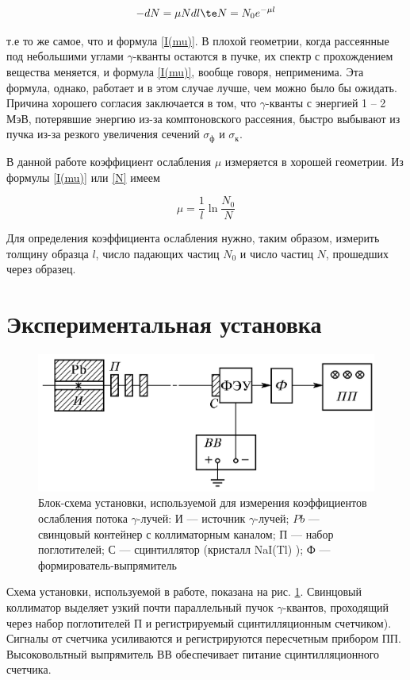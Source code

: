 \documentclass[12pt]{kiarticle} %
\newcommand{\ga}{\ensuremath{\gamma}}
\begin{document}
	\begin{equation}\label{N}
	-dN = \mu N dl \te N = N_0 e^{-\mu l}
	\end{equation}
	
	т.е то же самое, что и формула \eqref{I(mu)}. В плохой геометрии, когда рассеянные под небольшими углами
	\ga-кванты остаются в пучке, их спектр с прохождением вещества меняется, и формула \eqref{I(mu)}, вообще говоря, неприменима. Эта формула, однако, работает и в этом случае лучше, чем можно было бы ожидать. Причина хорошего согласия заключается в том, что \ga-кванты с энергией 1 -- 2 МэВ, потерявшие энергию из-за комптоновского рассеяния,
	быстро выбывают из пучка из-за резкого увеличения сечений $ \sigma_ф $ и $ \sigma_к $.
	
	В данной работе коэффициент ослабления $ \mu $ измеряется в хорошей
	геометрии. Из формулы \eqref{I(mu)} или \eqref{N} имеем
	
	\begin{equation}\label{mu}
	\mu = \dfrac{1}{l} \ln{\dfrac{N_0}{N}}
	\end{equation}
	
	Для определения коэффициента ослабления нужно, таким образом, измерить толщину образца $ l $, число падающих частиц $ N_0 $ и число
	частиц $ N $, прошедших через образец.
	
	\section{Экспериментальная установка}
	
		\begin{figure}[h!]
		\centering
		\includegraphics[width=0.7\linewidth]{lab}
		\caption{Блок-схема установки, используемой для измерения коэффициентов ослабления потока \ga-лучей: И --- источник \ga-лучей; $ Pb $ --- свинцовый контейнер с коллиматорным каналом; П --- набор поглотителей; С --- сцинтиллятор (кристалл
			NaI(Tl) ); Ф --- формирователь-выпрямитель}
		\label{ris lab}
	\end{figure}

Схема установки, используемой в работе, показана на рис. \ref{ris lab}. Свинцовый коллиматор выделяет узкий почти параллельный пучок \ga-квантов, проходящий через набор поглотителей П и регистрируемый сцинтилляционным счетчиком). Сигналы от счетчика усиливаются и регистрируются пересчетным прибором ПП. Высоковольтный выпрямитель ВВ обеспечивает питание сцинтилляционного счетчика.
\end{document}

